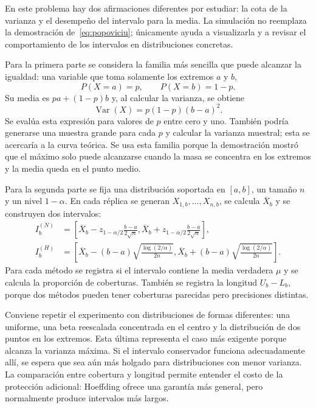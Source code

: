 \documentclass[10pt,a4paper,oneside]{article}
\newcommand{\Var}{\operatorname{Var}}
\begin{document}
En este problema hay dos afirmaciones diferentes por estudiar: la cota de la varianza y el desempeño del intervalo para la media. La simulación no reemplaza la demostración de~\eqref{eq:popoviciu}; únicamente ayuda a visualizarla y a revisar el comportamiento de los intervalos en distribuciones concretas.

Para la primera parte se considera la familia más sencilla que puede alcanzar la igualdad: una variable que toma solamente los extremos $a$ y $b$,
\begin{equation*}
P(X=a)=p,
\qquad
P(X=b)=1-p.
\end{equation*}
Su media es $pa+(1-p)b$ y, al calcular la varianza, se obtiene
\begin{equation*}
\Var(X)=p(1-p)(b-a)^2.
\end{equation*}
Se evalúa esta expresión para valores de $p$ entre cero y uno. También podría generarse una muestra grande para cada $p$ y calcular la varianza muestral; esta se acercaría a la curva teórica. Se usa esta familia porque la demostración mostró que el máximo solo puede alcanzarse cuando la masa se concentra en los extremos y la media queda en el punto medio.

Para la segunda parte se fija una distribución soportada en $[a,b]$, un tamaño $n$ y un nivel $1-\alpha$. En cada réplica se generan $X_{1,b},\ldots,X_{n,b}$, se calcula $\overline X_b$ y se construyen dos intervalos:
\begin{align*}
I^{(N)}_b&=\left[\overline X_b-z_{1-\alpha/2}\frac{b-a}{2\sqrt n},
\overline X_b+z_{1-\alpha/2}\frac{b-a}{2\sqrt n}\right],\\
I^{(H)}_b&=\left[\overline X_b-(b-a)\sqrt{\frac{\log(2/\alpha)}{2n}},
\overline X_b+(b-a)\sqrt{\frac{\log(2/\alpha)}{2n}}\right].
\end{align*}
Para cada método se registra si el intervalo contiene la media verdadera $\mu$ y se calcula la proporción de coberturas. También se registra la longitud $U_b-L_b$, porque dos métodos pueden tener coberturas parecidas pero precisiones distintas.

Conviene repetir el experimento con distribuciones de formas diferentes: una uniforme, una beta reescalada concentrada en el centro y la distribución de dos puntos en los extremos. Esta última representa el caso más exigente porque alcanza la varianza máxima. Si el intervalo conservador funciona adecuadamente allí, se espera que sea aún más holgado para distribuciones con menor varianza. La comparación entre cobertura y longitud permite entender el costo de la protección adicional: Hoeffding ofrece una garantía más general, pero normalmente produce intervalos más largos.
\end{document}
